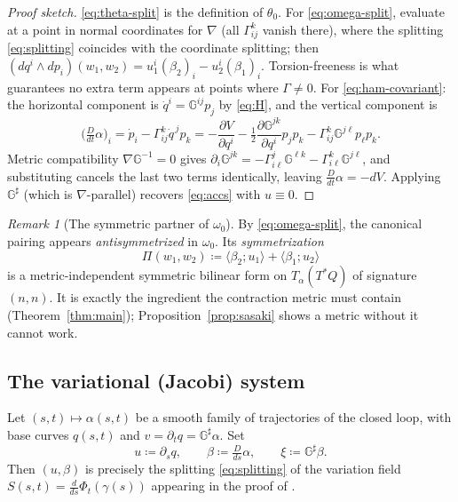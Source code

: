 \documentclass[11pt,a4paper]{article}
\newcommand{\Gm}{\mathbb{G}}                      %
\newcommand{\dpair}[2]{\langle #1 ; #2 \rangle}   %
\newcommand{\Gsharp}{\Gm^{\sharp}}
\newcommand{\Tstar}{T^{*}Q}
\newcommand{\Dt}{\tfrac{D}{dt}}
\theoremstyle{plain}
\theoremstyle{definition}
\theoremstyle{remark}
\newtheorem{remark}[theorem]{Remark}
\begin{document}
\begin{proof}[Proof sketch]
\eqref{eq:theta-split} is the definition of $\theta_0$. For
\eqref{eq:omega-split}, evaluate at a point in normal coordinates for $\nabla$
(all $\Gamma^k_{ij}$ vanish there), where the splitting \eqref{eq:splitting}
coincides with the coordinate splitting; then
$(dq^i\wedge dp_i)(w_1,w_2) = u_1^i(\beta_2)_i - u_2^i(\beta_1)_i$. Torsion-freeness
is what guarantees no extra term appears at points where $\Gamma \ne 0$.
For \eqref{eq:ham-covariant}: the horizontal component is
$\dot q^i = \Gm^{ij}p_j$ by \eqref{eq:H}, and the vertical component is
\[
  \big(\Dt\alpha\big)_i
  = \dot p_i - \Gamma^k_{ij}\dot q^{\,j} p_k
  = -\frac{\partial V}{\partial q^i}
    - \tfrac12\frac{\partial \Gm^{jk}}{\partial q^i}p_jp_k
    - \Gamma^k_{ij}\Gm^{j\ell}p_\ell p_k .
\]
Metric compatibility $\nabla\Gm^{-1}=0$ gives
$\partial_i\Gm^{jk} = -\Gamma^j_{i\ell}\Gm^{\ell k} - \Gamma^k_{i\ell}\Gm^{j\ell}$,
and substituting cancels the last two terms identically, leaving
$\Dt\alpha = -dV$. Applying $\Gsharp$ (which is $\nabla$-parallel) recovers
\eqref{eq:accs} with $u\equiv0$.
\end{proof}

\begin{remark}[The symmetric partner of $\omega_0$]
\label{rem:partner}
By \eqref{eq:omega-split}, the canonical pairing appears \emph{antisymmetrized}
in $\omega_0$. Its \emph{symmetrization}
\begin{equation}
  \Pi(w_1,w_2) \coloneqq \dpair{\beta_2}{u_1} + \dpair{\beta_1}{u_2}
  \label{eq:Pi}
\end{equation}
is a metric-independent symmetric bilinear form on $T_\alpha(\Tstar)$ of signature
$(n,n)$. It is exactly the ingredient the contraction metric must contain
(Theorem~\ref{thm:main}); Proposition~\ref{prop:sasaki} shows a metric without it
cannot work.
\end{remark}

\subsection{The variational (Jacobi) system}

Let $(s,t)\mapsto \alpha(s,t)$ be a smooth family of trajectories of the closed
loop, with base curves $q(s,t)$ and $v = \partial_t q = \Gsharp\alpha$. Set
\begin{equation}
  u \coloneqq \partial_s q,
  \qquad
  \beta \coloneqq \tfrac{D}{ds}\alpha,
  \qquad
  \xi \coloneqq \Gsharp\beta .
\end{equation}
Then $(u,\beta)$ is precisely the splitting \eqref{eq:splitting} of the variation
field $S(s,t) = \tfrac{d}{ds}\Phi_t(\gamma(s))$ appearing in the proof of
\cite[Thm.~2.3]{SB13}.
\end{document}
